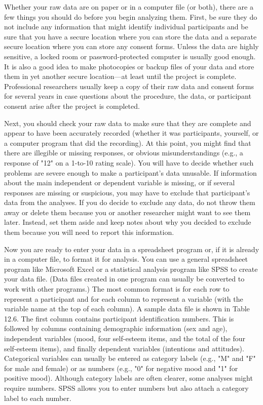 Whether your raw data are on paper or in a computer file (or both), there are a few things you should do before you begin analyzing them. First, be sure they do not include any information that might identify individual participants and be sure that you have a secure location where you can store the data and a separate secure location where you can store any consent forms. Unless the data are highly sensitive, a locked room or password-protected computer is usually good enough. It is also a good idea to make photocopies or backup files of your data and store them in yet another secure location---at least until the project is complete. Professional researchers usually keep a copy of their raw data and consent forms for several years in case questions about the procedure, the data, or participant consent arise after the project is completed.

Next, you should check your raw data to make sure that they are complete and appear to have been accurately recorded (whether it was participants, yourself, or a computer program that did the recording). At this point, you might find that there are illegible or missing responses, or obvious misunderstandings (e.g., a response of "12" on a 1-to-10 rating scale). You will have to decide whether such problems are severe enough to make a participant's data unusable. If information about the main independent or dependent variable is missing, or if several responses are missing or suspicious, you may have to exclude that participant's data from the analyses. If you do decide to exclude any data, do not throw them away or delete them because you or another researcher might want to see them later. Instead, set them aside and keep notes about why you decided to exclude them because you will need to report this information.

Now you are ready to enter your data in a spreadsheet program or, if it is already in a computer file, to format it for analysis. You can use a general spreadsheet program like Microsoft Excel or a statistical analysis program like SPSS to create your data file. (Data files created in one program can usually be converted to work with other programs.) The most common format is for each row to represent a participant and for each column to represent a variable (with the variable name at the top of each column). A sample data file is shown in Table 12.6. The first column contains participant identification numbers. This is followed by columns containing demographic information (sex and age), independent variables (mood, four self-esteem items, and the total of the four self-esteem items), and finally dependent variables (intentions and attitudes). Categorical variables can usually be entered as category labels (e.g., "M" and "F" for male and female) or as numbers (e.g., "0" for negative mood and "1" for positive mood). Although category labels are often clearer, some analyses might require numbers. SPSS allows you to enter numbers but also attach a category label to each number.

